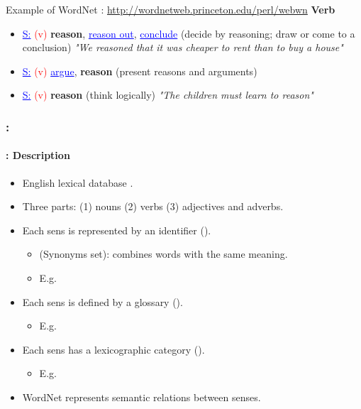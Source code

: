 \documentclass[xcolor=table]{beamer}
\begin{document}
\begin{frame}
\begin{exampleblock}{Example of WordNet : \small\url{http://wordnetweb.princeton.edu/perl/webwn}}
		{\small\bfseries Verb}
		\begin{itemize}\setlength\itemsep{0pt}
			\item \textcolor{blue}{\underline{S:}} \textcolor{red}{(v)} \textbf{reason}, \textcolor{blue}{\underline{reason out}}, \textcolor{blue}{\underline{conclude}} (decide by reasoning; draw or come to a conclusion) \textit{"We reasoned that it was cheaper to rent than to buy a house"}
			\item \textcolor{blue}{\underline{S:}} \textcolor{red}{(v)} \textcolor{blue}{\underline{argue}}, \textbf{reason} (present reasons and arguments)
			\item \textcolor{blue}{\underline{S:}} \textcolor{red}{(v)} \textbf{reason} (think logically) \textit{"The children must learn to reason"}
		\end{itemize}
	\end{exampleblock}
	
\end{frame}


\begin{frame}
	\frametitle{\insertshortsubtitle: \insertsection}
	\framesubtitle{\insertsubsection: Description}
	
	\begin{itemize}
		\item English lexical database \cite{1995-miller}.
		\item Three parts: (1) nouns (2) verbs (3) adjectives and adverbs.
		\item Each sens is represented by an identifier ().
		\begin{itemize}
			\item {} (Synonyms set): combines words with the same meaning. 
			\item E.g. 
		\end{itemize}
		\item Each sens is defined by a glossary ().
		\begin{itemize}
			\item E.g. 
		\end{itemize}
		\item Each sens has a lexicographic category ().
		\begin{itemize}
			\item E.g. 
		\end{itemize}
		\item WordNet represents semantic relations between senses.
	\end{itemize}
	
\end{frame}
\end{document}
